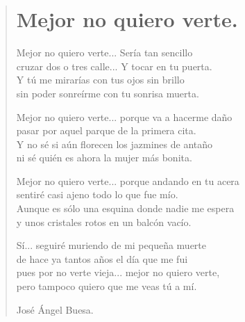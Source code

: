 \documentclass[11pt, portrait, twoside, notitlepage, openright]{book}
\begin{document}
\newpage
\begin{verse}
\begin{center}
\section{Mejor no quiero verte.}
\end{center}
Mejor no quiero verte... Sería tan sencillo\\
cruzar dos o tres calle... Y tocar en tu puerta.\\
Y tú me mirarías con tus ojos sin brillo\\
sin poder sonreírme con tu sonrisa muerta.
\newline

Mejor no quiero verte... porque va a hacerme daño\\
pasar por aquel parque de la primera cita.\\
Y no sé si aún florecen los jazmines de antaño\\
ni sé quién es ahora la mujer más bonita.
\newline

Mejor no quiero verte... porque andando en tu acera\\
sentiré casi ajeno todo lo que fue mío.\\
Aunque es sólo una esquina donde nadie me espera\\
y unos cristales rotos en un balcón vacío.
\newline

Sí... seguiré muriendo de mi pequeña muerte\\
de hace ya tantos años el día que me fui\\
pues por no verte vieja... mejor no quiero verte,\\
pero tampoco quiero que me veas tú a mí.
\newline

\begin{flushright}
José Ángel Buesa.
\end{flushright}
\end{verse}
\end{document}
